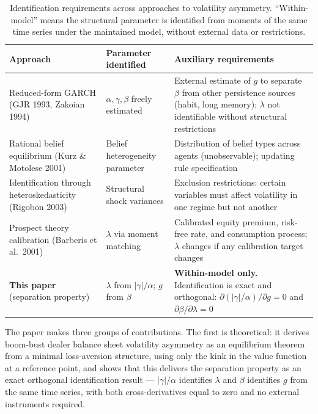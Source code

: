 \documentclass[12pt,a4paper]{article}
\theoremstyle{definition}
\begin{document}
\begin{table}[ht]
\centering
\caption{Identification requirements across approaches to volatility
asymmetry. ``Within-model'' means the structural parameter is identified
from moments of the same time series under the maintained model, without
external data or restrictions.}
\label{tab:identification_comparison}
\small
\begin{tabular}{p{3.8cm}p{3.0cm}p{5.8cm}}
\toprule
\textbf{Approach} & \textbf{Parameter identified} & \textbf{Auxiliary requirements} \\
\midrule
Reduced-form GARCH \newline (GJR 1993, Zakoian 1994)
  & $\alpha, \gamma, \beta$ freely estimated
  & External estimate of $g$ to separate $\beta$ from
    other persistence sources (habit, long memory);
    $\lambda$ not identifiable without structural
    restrictions \\[6pt]
Rational belief equilibrium \newline (Kurz \& Motolese 2001)
  & Belief heterogeneity parameter
  & Distribution of belief types across agents
    (unobservable); updating rule specification \\[6pt]
Identification through \newline heteroskedasticity \newline (Rigobon 2003)
  & Structural shock variances
  & Exclusion restrictions: certain variables must
    affect volatility in one regime but not another \\[6pt]
Prospect theory calibration \newline (Barberis et al.\ 2001)
  & $\lambda$ via moment matching
  & Calibrated equity premium, risk-free rate, and
    consumption process; $\lambda$ changes if any
    calibration target changes \\[6pt]
\textbf{This paper} \newline (separation property)
  & $\lambda$ from $|\gamma|/\alpha$; \newline $g$ from $\beta$
  & \textbf{Within-model only.} Identification is exact
    and orthogonal:
    $\partial(|\gamma|/\alpha)/\partial g = 0$ and
    $\partial\beta/\partial\lambda = 0$ \\
\bottomrule
\end{tabular}
\end{table}

The paper makes three groups of contributions. The first is theoretical:
it derives boom-bust dealer balance sheet volatility asymmetry as an
equilibrium theorem from a minimal loss-aversion structure, using only
the kink in the value function at a reference point, and shows that this
delivers the separation property as an exact orthogonal identification
result --- $|\gamma|/\alpha$ identifies $\lambda$ and $\beta$ identifies
$g$ from the same time series, with both cross-derivatives equal to zero
and no external instruments required.
\end{document}
